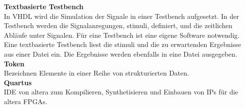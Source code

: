 \textbf{Textbasierte Testbench}\\
In VHDL wird die Simulation der Signale in einer Testbench aufgesetzt. In der Testbench werden die Signalanregungen, stimuli, definiert, und die zeitlichen Abläufe unter Signalen. Für eine Testbench ist eine eigene Software notwendig.\\
Eine textbasierte Testbench liest die stimuli und die zu erwartenden Ergebnisse aus einer Datei ein. Die Ergebnisse werden ebenfalls in eine Datei ausgegeben.\\

\textbf{Token}\\
Bezeichnen Elemente in einer Reihe von strukturierten Daten.\\

\textbf{Quartus}\\
IDE von altera zum Kompilieren, Synthetisieren und Einbauen von IPs für die altera FPGAs.\\

